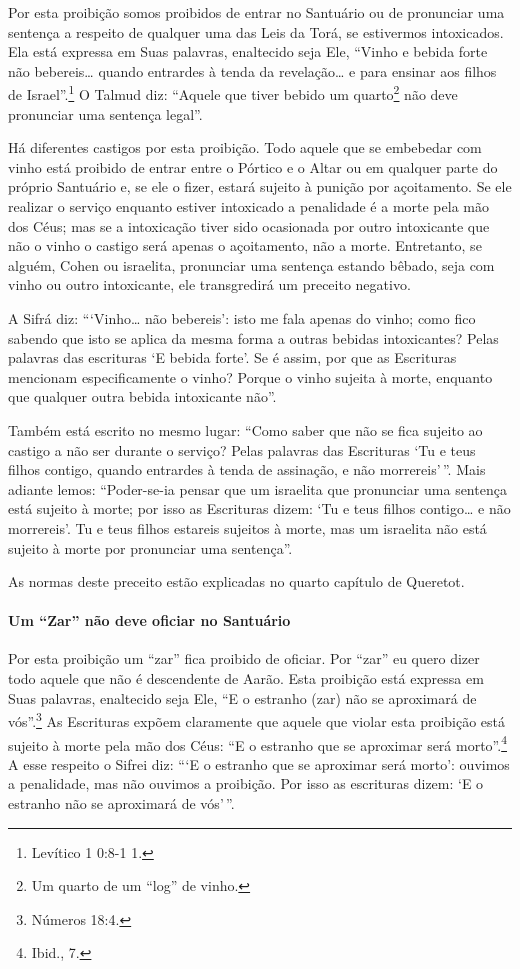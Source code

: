 Por esta proibição somos proibidos de entrar no Santuário ou de
pronunciar uma sentença a respeito de qualquer uma das Leis da Torá, se
estivermos intoxicados. Ela está expressa em Suas palavras, enaltecido
seja Ele, ``Vinho e bebida forte não bebereis\ldots{} quando entrardes à
tenda da revelação\ldots{} e para ensinar aos filhos de Israel''.\footnote{Levítico 1
0:8-1 1.} O Talmud diz: ``Aquele que tiver bebido um
quarto\footnote{Um quarto de um ``log'' de vinho.} não deve pronunciar uma sentença legal''.

Há diferentes castigos por esta proibição. Todo aquele que se embebedar
com vinho está proibido de entrar entre o Pórtico e o Altar ou em
qualquer parte do próprio Santuário e, se ele o fizer, estará sujeito à
punição por açoitamento. Se ele realizar o serviço enquanto estiver
intoxicado a penalidade é a morte pela mão dos Céus; mas se a
intoxicação tiver sido ocasionada por outro intoxicante que não o vinho
o castigo será apenas o açoitamento, não a morte. Entretanto, se alguém,
Cohen ou israelita, pronunciar uma sentença estando bêbado, seja
com vinho ou outro intoxicante, ele transgredirá um preceito negativo.

A Sifrá diz: ```Vinho\ldots{} não bebereis': isto me fala apenas do vinho;
como fico sabendo que isto se aplica da mesma forma a outras bebidas
intoxicantes? Pelas palavras das escrituras `E bebida forte'. Se é
assim, por que as Escrituras mencionam especificamente o vinho? Porque
o vinho sujeita à morte, enquanto que qualquer outra bebida intoxicante
não''.

Também está escrito no mesmo lugar: ``Como saber que não se fica sujeito
ao castigo a não ser durante o serviço? Pelas palavras das Escrituras
`Tu e teus filhos contigo, quando entrardes à tenda de assinação, e não
morrereis'\,''. Mais adiante lemos: ``Poder-se-ia pensar que um israelita
que pronunciar uma sentença está sujeito à morte; por isso as Escrituras
dizem: `Tu e teus filhos contigo\ldots{} e não morrereis'. Tu e teus filhos
estareis sujeitos à morte, mas um israelita não está sujeito à morte
por pronunciar uma sentença''.

As normas deste preceito estão explicadas no quarto capítulo de Queretot.

\paragraph{Um ``Zar'' não deve oficiar no Santuário}

Por esta proibição um ``zar'' fica proibido de oficiar. Por ``zar'' eu
quero dizer todo aquele que não é descendente de Aarão. Esta proibição
está expressa em Suas palavras, enaltecido seja Ele, ``E o estranho
(zar) não se aproximará de vós''.\footnote{Números 18:4.} As Escrituras expõem claramente que
aquele que violar esta proibição está sujeito à morte pela mão dos Céus:
``E o estranho que se aproximar será morto''.\footnote{Ibid., 7.} A esse respeito
o Sifrei diz: ```E o estranho que se aproximar será morto': ouvimos a
penalidade, mas não ouvimos a proibição. Por isso as escrituras dizem:
`E o estranho não se aproximará de vós'\,''.

